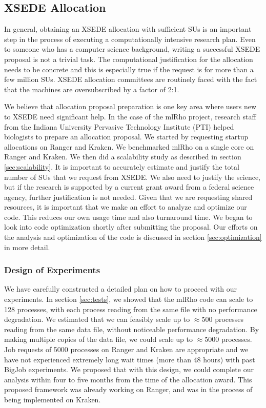 \documentclass{sig-alternate}
\newcommand{\abhi}[1]{ {\textcolor{red} { ***Abhinav: #1 }}}
\newcommand{\abhi}[1]{ {}}
\begin{document}
\subsection{XSEDE Allocation}

In general, obtaining an XSEDE allocation with sufficient SUs is an important step in the process of executing
a computationally intensive research plan. Even to someone who has a computer science background, writing a
successful XSEDE proposal is not a trivial task. The computational justification for the allocation needs to
be concrete and this is especially true if the request is for more than a few million SUs. XSEDE
allocation committees are routinely faced with the fact that the machines are oversubscribed by a factor of 2:1.

We believe that allocation proposal preparation is one key area where users new to XSEDE need significant
help. In the case of the mlRho project, research staff from the Indiana University Pervasive Technology
Institute (PTI) helped biologists to prepare an allocation proposal. We started by requesting startup
allocations on Ranger and Kraken. We benchmarked mlRho on a single core on Ranger and Kraken. We then did a
scalability study as described in section \ref{sec:scalability}. It is important to accurately estimate and
justify the total number of SUs that we request from XSEDE.  We also need to justify the science, but if the
research is supported by a current grant award from a federal science agency, further justification is not
needed. Given that we are requesting shared resources, it is important that we make an effort to analyze and
optimize our code. This reduces our own usage time and also turnaround time. We began to look into code
optimization shortly after submitting the proposal. Our efforts on the analysis and optimization of the code
is discussed in section \ref{sec:optimization} in more detail.


\subsubsection{Design of Experiments}

We have carefully constructed a detailed plan on how to proceed with our experiments. In section
\ref{sec:tests}, we showed that the mlRho code can scale to 128 processes, with each process reading from the
same file with no performance degradation. We estimated that we can feasibly scale up to $\approx$500
processes reading from the same data file, without noticeable performance degradation. By making multiple
copies of the data file, we could scale up to $\approx$5000 processes. Job requests of 5000 processes on
Ranger and Kraken are appropriate and we have not experienced extremely long wait times (more than 48 hours) with past BigJob
experiments. We proposed that with this design, we could complete our analysis within four to five months from
the time of the allocation award. This proposed framework was already working on Ranger, and was in the
process of being implemented on Kraken.
\end{document}
